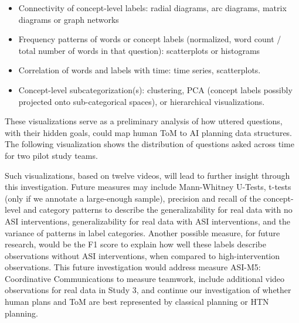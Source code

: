 \documentclass[10pt]{article}
\begin{document}
\begin{itemize}

    \item Connectivity of concept-level labels: radial diagrams, arc diagrams,
        matrix diagrams or graph networks

    \item Frequency patterns of words or concept labels (normalized, word count
        / total number of words in that question): scatterplots or histograms

    \item Correlation of words and labels with time: time series, scatterplots. 

    \item Concept-level subcategorization(s): clustering, PCA (concept labels
        possibly projected onto sub-categorical spaces), or hierarchical
        visualizations.

\end{itemize}


These visualizations serve as a preliminary analysis of how uttered
questions, with their hidden goals, could map human ToM to AI planning data
structures. The following visualization shows the distribution of
questions asked across time for two pilot study teams. 

Such visualizations, based on twelve videos, will lead to further insight
through this investigation. Future measures may include Mann-Whitney U-Tests,
t-tests (only if we annotate a large-enough sample), precision and recall of
the concept-level and category patterns to describe the generalizability for
real data with no ASI interventions, generalizability for real data with ASI
interventions, and the variance of patterns in label categories. Another
possible measure, for future research, would be the F1 score to explain how
well these labels describe observations without ASI interventions, when
compared to high-intervention observations. This future investigation would
address measure ASI-M5: Coordinative Communications to
measure teamwork, include additional video observations for real data in Study
3, and continue our investigation of whether human plans and ToM are best
represented by classical planning or HTN planning.
\end{document}
